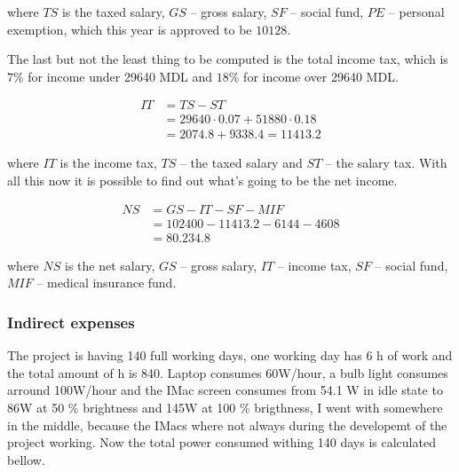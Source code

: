 \noindent
where $TS$ is the taxed salary, $GS$ -- gross salary, $SF$ -- social fund, $PE$ -- personal exemption, which this year is approved to be $10128$.

The last but not the least thing to be computed is the total income tax, which is $7\%$ for income under 29640 MDL and $18\%$ for income over 29640 MDL.

\begin{equation}
\begin{split}
 IT &= TS - ST \\
      &= 29640 \cdot 0.07 + 51880 \cdot 0.18 \\
      & = 2074.8 + 9338.4 = 11413.2
 \end{split}
\end{equation}

\noindent
where $IT$ is the income tax, $TS$ -- the taxed salary and $ST$ -- the salary tax. With all this now it is possible to find out what's going to be the net income.

\begin{equation}
\begin{split}
 NS &= GS - IT - SF - MIF \\
            &= 102400 - 11413.2 - 6144 - 4608 \\
            &= 80.234.8
\end{split}
\end{equation}

\noindent
where $NS$ is the net salary, $GS$ -- gross salary, $IT$ -- income tax, $SF$ -- social fund, $MIF$ -- medical insurance fund.

\subsubsection{Indirect expenses}

The project is having 140 full working days, one working day has 6 h of work and the total amount of h is 840.
Laptop consumes 60W/hour, a bulb light consumes arround 100W/hour and the IMac screen consumes from 54.1 W in idle state to 86W at 50 \% brightness and 145W at 100 \% brigthness, I went with somewhere in the middle, because the IMacs where not always during the developemt of the project working. Now the total power consumed withing 140 days is calculated bellow.

